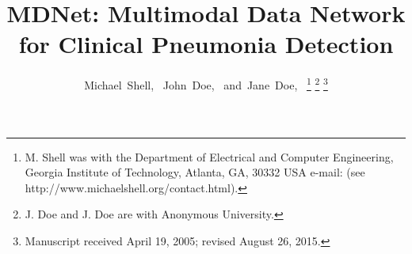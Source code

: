 \documentclass[journal]{IEEEtran}
\begin{document}
%
\title{MDNet: Multimodal Data Network for Clinical Pneumonia Detection}
%
%
%

\author{Michael~Shell,~
        John~Doe,~
        and~Jane~Doe,~%
\thanks{M. Shell was with the Department
of Electrical and Computer Engineering, Georgia Institute of Technology, Atlanta,
GA, 30332 USA e-mail: (see http://www.michaelshell.org/contact.html).}%
\thanks{J. Doe and J. Doe are with Anonymous University.}%
\thanks{Manuscript received April 19, 2005; revised August 26, 2015.}}

% 
%
\end{document}
